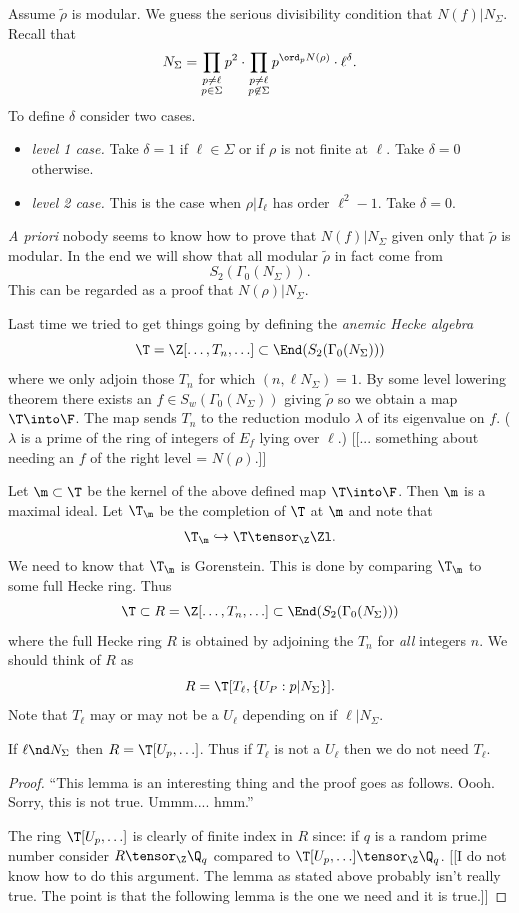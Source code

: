 \documentclass{report}
\begin{document}
Assume $\tilde{\rho}$ is modular.
We guess the serious divisibility condition that $N(f)|N_{\Sigma}$.
Recall that
$$N_{\Sigma}=\prod_{\substack{p\neq\ell\\p\in\Sigma}} p^2
            \cdot \prod_{\substack{p\neq\ell\\p\not\in\Sigma}}
                         p^{\ord_p N(\rho)}
            \cdot \ell^{\delta}.$$
To define $\delta$ consider two cases.
\begin{itemize}
\item {\em level 1 case.} Take $\delta=1$ if $\ell\in\Sigma$
or if $\rho$ is not finite at $\ell$. Take $\delta=0$ otherwise.
\item {\em level 2 case.} This is the case when $\rho|I_{\ell}$
has order $\ell^2-1$. Take $\delta=0$.
\end{itemize}

{\em A priori} nobody seems to know how to prove that $N(f)|N_{\Sigma}$
given only that $\tilde{\rho}$ is modular. In the end we will show
that all modular $\tilde{\rho}$ in fact come from
$$S_2(\Gamma_0(N_{\Sigma})).$$
This can be regarded as a proof that $N(\rho)|N_{\Sigma}$.

Last time we tried to get things going by defining the {\em anemic Hecke algebra}
$$\T=\Z[\ldots,T_n,\ldots]\subset \End(S_2(\Gamma_0(N_{\Sigma})))$$
where we only adjoin those $T_n$ for which $(n,\ell N_{\Sigma})=1$.
By some level lowering theorem there exists an
$f\in S_w(\Gamma_0(N_{\Sigma}))$ giving $\tilde{\rho}$ so we
obtain a map $\T\into \F$. The map sends $T_n$ to the reduction modulo
$\lambda$ of its eigenvalue on $f$. ($\lambda$ is a prime of the
ring of integers of $E_f$ lying over $\ell$.)
[[... something about needing an $f$ of the right level = $N(\rho)$.]]

Let $\m\subset\T$ be the kernel of the above defined map
$\T\into\F$. Then $\m$ is a maximal ideal. Let $\T_{\m}$ be the
completion of $\T$ at $\m$ and note that
$$\T_{\m}\hookrightarrow \T\tensor_{\Z}\Zl.$$
We need to know that $\T_{\m}$ is Gorenstein. This is done
by comparing $\T_{\m}$ to some full Hecke ring. Thus
$$\T\subset R=\Z[\ldots,T_n,\ldots]\subset\End(S_2(\Gamma_0(N_{\Sigma})))$$
where the full Hecke ring $R$ is obtained by adjoining
the $T_n$ for {\em all} integers $n$.
We should think of $R$ as
$$R=\T[T_{\ell}, \{U_P : p|N_{\Sigma}\}].$$
Note that $T_{\ell}$ may or may not be a $U_{\ell}$ depending on
if $\ell|N_{\Sigma}$.

\begin{lemma} If $\ell\nd N_{\Sigma}$ then $R=\T[U_p,\ldots]$. Thus
if $T_{\ell}$ is not a $U_{\ell}$ then we do not need $T_{\ell}$.
\end{lemma}
\begin{proof}
``This lemma is an interesting thing and the proof goes as follows.
Oooh. Sorry, this is not true. Ummm.... hmm.''

The ring $\T[U_p,\ldots]$ is clearly of finite index in $R$ since:
if $q$ is a random prime number consider
$R\tensor_{\Z}\Q_q$ compared to $\T[U_p,\ldots]\tensor_{\Z}\Q_q$.
[[I do not know how to do this argument. The lemma as stated above
probably isn't really true. The point is that the following lemma
is the one we need and it is true.]]
\end{proof}
\end{document}
